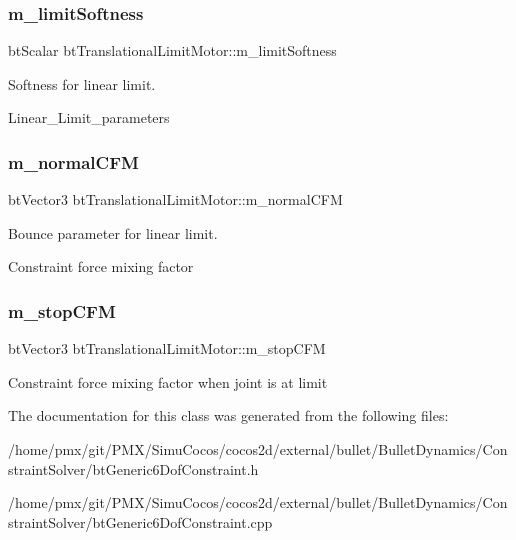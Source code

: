 \subsubsection{\texorpdfstring{m\+\_\+limit\+Softness}{m\_limitSoftness}}
{\footnotesize\ttfamily bt\+Scalar bt\+Translational\+Limit\+Motor\+::m\+\_\+limit\+Softness}



Softness for linear limit. 

Linear\+\_\+\+Limit\+\_\+parameters \mbox{\label{classbtTranslationalLimitMotor_a8970a726c2b50a0c60c0c8e079cc784f}} 
\subsubsection{\texorpdfstring{m\+\_\+normal\+C\+FM}{m\_normalCFM}}
{\footnotesize\ttfamily bt\+Vector3 bt\+Translational\+Limit\+Motor\+::m\+\_\+normal\+C\+FM}



Bounce parameter for linear limit. 

Constraint force mixing factor \mbox{\label{classbtTranslationalLimitMotor_a531c6ae0a0805eaa4fc59a40982a67f8}} 
\subsubsection{\texorpdfstring{m\+\_\+stop\+C\+FM}{m\_stopCFM}}
{\footnotesize\ttfamily bt\+Vector3 bt\+Translational\+Limit\+Motor\+::m\+\_\+stop\+C\+FM}

Constraint force mixing factor when joint is at limit 

The documentation for this class was generated from the following files\+:\begin{DoxyCompactItemize}
\item 
/home/pmx/git/\+P\+M\+X/\+Simu\+Cocos/cocos2d/external/bullet/\+Bullet\+Dynamics/\+Constraint\+Solver/bt\+Generic6\+Dof\+Constraint.\+h\item 
/home/pmx/git/\+P\+M\+X/\+Simu\+Cocos/cocos2d/external/bullet/\+Bullet\+Dynamics/\+Constraint\+Solver/bt\+Generic6\+Dof\+Constraint.\+cpp\end{DoxyCompactItemize}
